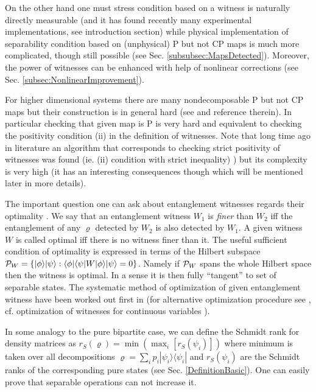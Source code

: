 \documentclass[twocolumn,aps,rmp]{revtex4}
\begin{document}
On the other hand one must stress condition based on a witness is
naturally directly measurable \cite{Terhal2000-laa} (and it has found
recently many experimental implementations, see introduction section)
while physical implementation of separability condition based on
(unphysical) P but not CP maps is much more complicated, though still
possible (see Sec. \ref{subsubsec:MapsDetected}).  Moreover, the power
of witnesses can be enhanced with help of nonlinear corrections (see
Sec.  \ref{subsec:NonlinearImprovement}).

For higher dimensional systems there are many nondecomposable P but
not CP maps but their construction is in general hard (see
\cite{Kossakowski} and reference therein). In particular checking that
given map is P is very hard and equivalent to checking the positivity
condition (ii) in the definition of witnesses. Note that long time ago
in literature an algorithm that corresponds to checking strict
positivity of witnesses was found (ie. (ii) condition with strict
inequality) \cite{JamiolkowskiAlgorithm}) but its complexity is very
high (it has an interesting consequences though which will be
mentioned later in more details).

The important question one can ask about entanglement witnesses
regards their optimality \cite{Lewenstein00a,Lewenstein00b}.  We say
that an entanglement witness $W_{1}$ is {\it finer} than $W_{2}$ iff
the entanglement of any $\varrho$ detected by $W_{2}$ is also detected
by $W_{1}$. A given witness $W$ is called optimal iff there is no
witness finer than it. The useful sufficient condition of optimality
\cite{Lewenstein00a} is expressed in terms of the Hilbert subspace
${\cal P}_{W}=\{ |\phi\rangle|\psi\rangle : \langle \phi|\langle\psi
|W|\phi\rangle|\psi\rangle=0\}$. Namely if ${\cal P}_{W}$ spans the
whole Hilbert space then the witness is optimal. In a sense it is then
fully ``tangent'' to set of separable states. The systematic method of
optimization of given entanglement witness have been worked out first
in \cite{Lewenstein00a,Lewenstein00b} (for alternative optimization
procedure see \cite{EisertAlgorithm}, cf.  optimization of witnesses
for continuous variables \cite{EisertCVNonlinearWitnesses}).

In some analogy to the pure bipartite case, we can define the Schmidt
rank for density matrices \cite{Terhal-Pawel-rank} as $r_{S}(\varrho)=
\min(\max_{i}[r_{S}(\psi_{i})])$ where minimum is taken over all
decompositions $\varrho=\sum_{i}p_{i}|\psi_{i}\rangle \langle
\psi_{i}|$ and $r_{S}(\psi_{i})$ are the Schmidt ranks of the
corresponding pure states (see Sec. \ref{DefinitionBasic}).  One can
easily prove that separable operations can not increase it.
\end{document}
